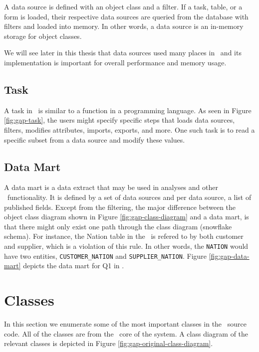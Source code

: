 A data source is defined with an object class and a filter. If a task, table, or a form is loaded, their respective data sources are queried from the database with filters and loaded into memory. In other words, a data source is an in-memory storage for object classes.

We will see later in this thesis that data sources used many places in \gap~and its implementation is important for overall performance and memory usage.

\subsection{Task}
\label{sub:Task}
A task in \gap~is similar to a function in a programming language. As seen in Figure \ref{fig:gap-task}, the users might specify specific steps that loads data sources, filters, modifies attributes, imports, exports, and more. One such task is to read a specific subset from a data source and modify these values.

\subsection{Data Mart}
\label{sub:Data Mart}
A data mart is a data extract that may be used in analyses and other \bd~functionality. It is defined by a set of data sources and per data source, a list of published fields.  Except from the filtering, the major difference between the object class diagram shown in Figure \ref{fig:gap-class-diagram} and a data mart, is that there might only exist one path through the class diagram (snowflake schema). For instance, the Nation table in the \tpch~is refered to by both customer and supplier, which is a violation of this rule. In other words, the \texttt{NATION} would have two entities, \texttt{CUSTOMER\_NATION} and \texttt{SUPPLIER\_NATION}. Figure \ref{fig:gap-data-mart} depicts the data mart for Q1 in \tpch.


\section{Classes}
\label{sec:Classes}
In this section we enumerate some of the most important classes in the \gap~source code. All of the classes are from the \delphi~core of the system. A class diagram of the relevant classes is depicted in Figure \ref{fig:gap-original-class-diagram}.

